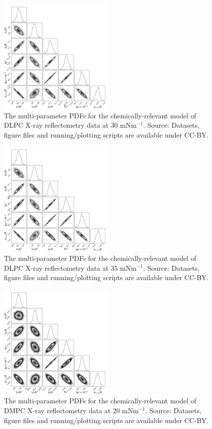 \documentclass[11pt,a4paper]{article}
\begin{document}
\begin{figure}[h]
	\centering
	\includegraphics[width=0.50\textwidth]{figures/dlpc3_all_corner}
	\caption{The multi-parameter PDFs for the chemically-relevant model of DLPC X-ray reflectometry data at 30 mNm$^{-1}$. Source: Datasets, figure files and running/plotting scripts are available under CC-BY.\cite{mccluskey_2018}}
	\label{fig:dlpc4}
\end{figure}
\begin{figure}
	\centering
	\includegraphics[width=0.50\textwidth]{figures/dlpc4_all_corner}
	\caption{The multi-parameter PDFs for the chemically-relevant model of DLPC X-ray reflectometry data at 35 mNm$^{-1}$. Source: Datasets, figure files and running/plotting scripts are available under CC-BY.\cite{mccluskey_2018}}
	\label{fig:dlpc5}
\end{figure}
\begin{figure}[h]
	\centering
	\includegraphics[width=0.50\textwidth]{figures/dmpc2_all_corner}
	\caption{The multi-parameter PDFs for the chemically-relevant model of DMPC X-ray reflectometry data at 20 mNm$^{-1}$. Source: Datasets, figure files and running/plotting scripts are available under CC-BY.\cite{mccluskey_2018}}
	\label{fig:dmpc2}
\end{figure}
\end{document}
